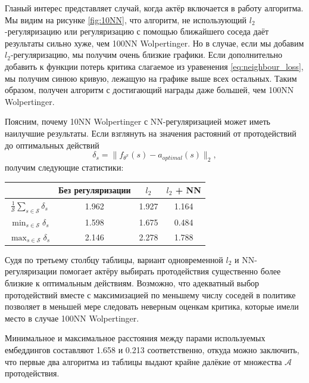 \documentclass[a4paper, 12pt]{article}
\begin{document}
Гланый интерес представляет случай, когда актёр включается в работу алгоритма. Мы видим на рисунке \ref{fig:10NN}, что алгоритм, не использующий $l_2$-регуляри\-зацию или регуляризацию с помощью ближайшего соседа даёт результаты сильно хуже, чем 100NN Wolpertinger. Но в случае, если мы добавим $l_2$-регуляризацию, мы получим очень близкие графики. Если дополнительно добавить к функции потерь критика слагаемое из уравенения \ref{eq:neighbour_loss}, мы получим синюю кривую, лежащую на графике выше всех остальных. Таким образом, получен алгоритм с достигающий награды даже большей, чем 100NN Wolpertinger.

Поясним, почему 10NN Wolpertinger с NN-регуляризацией может иметь наилучшие результаты.
Если взглянуть на значения растояний от протодействий до оптимальных действий $$\delta_s =  \|f_{\theta^\pi}(s) - a_{optimal} (s) \|_2,$$ 
получим следующие статистики:

\begin{center}
\setcellgapes{5pt}
\makegapedcells
\begin{tabular}{|c | c | c | c|} 
 \hline
  & Без регуляризации & $l_2$ & $l_2$ + NN \\
 \hline
 $\frac{1}{\mathcal{S}} \sum_{s \in \mathcal{S}} \delta_s$ & 1.962 & 1.927 & 1.164 \\ 
 \hline
  $\min_{s \in \mathcal{S}} \delta_s$ & 1.598 & 1.675 & 0.484 \\
 \hline
  $\max_{s \in \mathcal{S}} \delta_s$ & 2.146 & 2.278 & 1.788 \\
 \hline
\end{tabular}
\end{center}

Судя по третьему столбцу таблицы, вариант одновременной $l_2$ и NN-регуляризации помогает актёру выбирать протодействия существенно более близкие к оптимальным действиям.  
Возможно, что адекватный выбор протодействий вместе с максимизацией по меньшему числу соседей в политике позволяет в меньшей мере следовать неверным оценкам критика, которые имели место в случае 100NN Wolpertinger.

Минимальное и максимальное расстояния между парами используемых ембеддингов составляют 1.658 и 0.213 соответственно, откуда можно заключить, что первые два алгоритма из таблицы выдают крайне далёкие от множества $\mathcal{A}$ протодействия.
\end{document}
